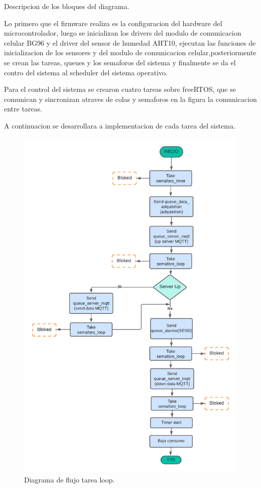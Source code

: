 Descripcion de los bloques del diagrama.

Lo primero que el firmware realiza es la configuracion del hardware del microcontrolador, luego se inicializan los drivers del modulo de comunicacion celular BG96 y el driver del sensor de humedad AHT10, ejecutan las funciones de inicializacion de los sensores y del modulo de comunicacion celular,posteriormente se crean las tareas, queues y los semaforos del sistema y finalmente se da el contro del sistema al scheduler del sistema operativo. 

Para el control del sistema se crearon cuatro tareas sobre freeRTOS, que se comunican y sincronizan atraves de colas y semaforos en la figura la comunicacion entre tareas.

A continuacion se desarrollara a implementacion de cada tarea del sistema.

\begin{figure}[htbp]
  \centering
	\includegraphics[width=1\textwidth]{./Figures/DF task loop.png}
	\caption{Diagrama de flujo tarea loop.}
	\label{fig:Df tarea loop sistema}
\end{figure}

